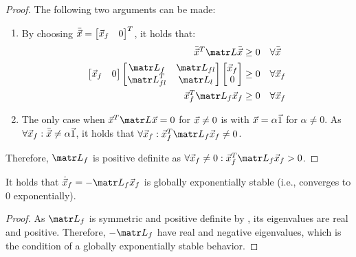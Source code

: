 \begin{lemma}
\begin{proof}
        The following two arguments can be made:
        \begin{enumerate}
            \item By choosing $\bar{{\vec{x}}} = \begin{bmatrix} {\vec{x}}_f & 0 \end{bmatrix}^T$, it holds that:
                \[
                    \begin{aligned}
                        \bar{\x}^T \lap \bar{\x} &\geq 0 & & \forall \bar{\x} \\
                        \begin{bmatrix} \x_f & 0 \end{bmatrix}
                        \begin{bmatrix}
                            \lap_f & \lap_{fl} \\
                            \lap_{fl}^T & \lap_{l} \\
                        \end{bmatrix}
                        \begin{bmatrix} \x_f \\ 0 \end{bmatrix} &\geq 0 & & \forall \x_f \\
                        \x_f^T \lap_f \x_f &\geq 0 & & \forall \x_f
                    \end{aligned}
                \]
            \item The only case when $\x^T \lap \x = 0$ for ${\vec{x}} \neq 0$ is with ${\vec{x}} = \alpha\vec{1}$ for $\alpha \neq 0$. As $\forall {\vec{x}}_f: \bar{{\vec{x}}} \neq \alpha\vec{1}$, it holds that $\forall \x_f: \x_f^T \lap_f \x_f \neq 0$.
        \end{enumerate}
        Therefore, $\lap_f$ is positive definite as $\forall \x_f \neq 0: \x_f^T \lap_f \x_f > 0$.
    \end{proof}
\end{lemma}

\begin{lemma} \label{th:laplacian_globally_exponentially_stable}
    It holds that $\dot{\x}_f = -\lap_f \x_f$ is globally exponentially stable (i.e., converges to $0$ exponentially).

    \begin{proof}
        As $\lap_f$ is symmetric and positive definite by , its eigenvalues are real and positive. Therefore, $-\lap_f$ have real and negative eigenvalues, which is the condition of a globally exponentially stable behavior.
    \end{proof}
\end{lemma}


